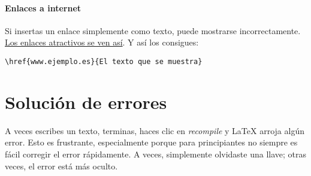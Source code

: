 \paragraph{Enlaces a internet}
Si insertas un enlace simplemente como texto, puede mostrarse incorrectamente. \href{www.cursosdepreparacionparaelparto.es}{Los enlaces atractivos se ven así}. Y así los consigues:

\begin{verbatim}
\href{www.ejemplo.es}{El texto que se muestra}
\end{verbatim}

\section{Solución de errores}

A veces escribes un texto, terminas, haces clic en \emph{recompile} y \LaTeX{} arroja algún error. Esto es frustrante, especialmente porque para principiantes no siempre es fácil corregir el error rápidamente. A veces, simplemente olvidaste una llave; otras veces, el error está más oculto.

